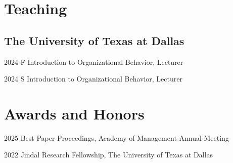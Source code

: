 \documentclass[11pt,letterpaper]{report} %
\begin{document}






    \section*{Teaching}

    \subsection*{The University of Texas at Dallas}

    \begin{tablist}

        \item[2024 F] \tab{}Introduction to Organizational Behavior, Lecturer
        \item[2024 S] \tab{}Introduction to Organizational Behavior, Lecturer
        
    \end{tablist}


    \section*{Awards and Honors} %


    \begin{tablist}

        \item[2025] \tab{}Best Paper Proceedings, Academy of Management Annual Meeting
        \item[2022] \tab{}Jindal Research Fellowship, The University of Texas at Dallas

    \end{tablist}

\end{document}
